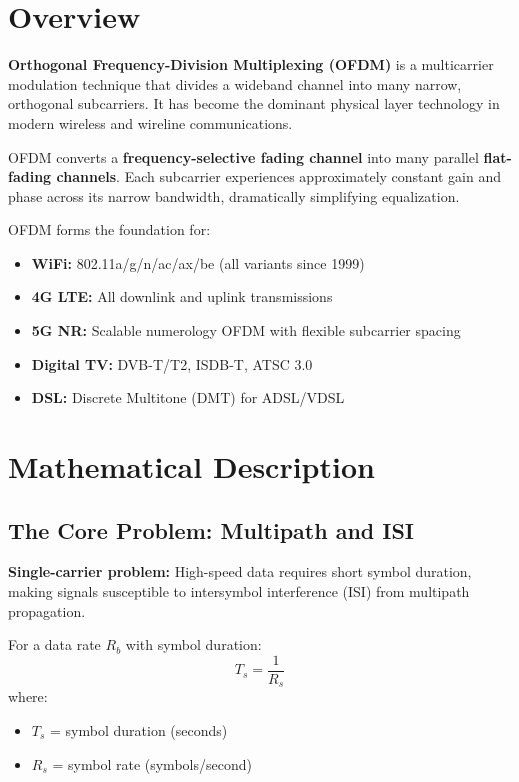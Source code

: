 \section{Overview}

\textbf{Orthogonal Frequency-Division Multiplexing (OFDM)} is a multicarrier modulation technique that divides a wideband channel into many narrow, orthogonal subcarriers. It has become the dominant physical layer technology in modern wireless and wireline communications.

\begin{keyconcept}
OFDM converts a \textbf{frequency-selective fading channel} into many parallel \textbf{flat-fading channels}. Each subcarrier experiences approximately constant gain and phase across its narrow bandwidth, dramatically simplifying equalization.
\end{keyconcept}

OFDM forms the foundation for:
\begin{itemize}
\item \textbf{WiFi:} 802.11a/g/n/ac/ax/be (all variants since 1999)
\item \textbf{4G LTE:} All downlink and uplink transmissions
\item \textbf{5G NR:} Scalable numerology OFDM with flexible subcarrier spacing
\item \textbf{Digital TV:} DVB-T/T2, ISDB-T, ATSC 3.0
\item \textbf{DSL:} Discrete Multitone (DMT) for ADSL/VDSL
\end{itemize}

\section{Mathematical Description}

\subsection{The Core Problem: Multipath and ISI}

\textbf{Single-carrier problem:} High-speed data requires short symbol duration, making signals susceptible to intersymbol interference (ISI) from multipath propagation.

For a data rate $R_b$ with symbol duration:
\begin{equation}
T_s = \frac{1}{R_s}
\end{equation}
where:
\begin{itemize}
\item $T_s$ = symbol duration (seconds)
\item $R_s$ = symbol rate (symbols/second)
\end{itemize}

